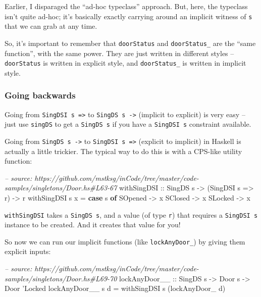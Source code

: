 \documentclass[]{article}
\newenvironment{Shaded}{}{}
\newcommand{\KeywordTok}[1]{\textcolor[rgb]{0.00,0.44,0.13}{\textbf{#1}}}
\newcommand{\DataTypeTok}[1]{\textcolor[rgb]{0.56,0.13,0.00}{#1}}
\newcommand{\CharTok}[1]{\textcolor[rgb]{0.25,0.44,0.63}{#1}}
\newcommand{\CommentTok}[1]{\textcolor[rgb]{0.38,0.63,0.69}{\textit{#1}}}
\newcommand{\OtherTok}[1]{\textcolor[rgb]{0.00,0.44,0.13}{#1}}
\newcommand{\FunctionTok}[1]{\textcolor[rgb]{0.02,0.16,0.49}{#1}}
\newcommand{\NormalTok}[1]{#1}
\begin{document}
Earlier, I disparaged the ``ad-hoc typeclass'' approach. But, here, the
typeclass isn't quite ad-hoc; it's basically exactly carrying around an implicit
witness of \texttt{s} that we can grab at any time.

So, it's important to remember that \texttt{doorStatus} and
\texttt{doorStatus\_} are the ``same function'', with the same power. They are
just written in different styles -- \texttt{doorStatus} is written in explicit
style, and \texttt{doorStatus\_} is written in implicit style.

\subsubsection{Going backwards}\label{going-backwards}

Going from \texttt{SingDSI\ s\ =\textgreater{}} to
\texttt{SingDS\ s\ -\textgreater{}} (implicit to explicit) is very easy -- just
use \texttt{singDS} to get a \texttt{SingDS\ s} if you have a
\texttt{SingDSI\ s} constraint available.

Going from \texttt{SingDS\ s\ -\textgreater{}} to
\texttt{SingDSI\ s\ =\textgreater{}} (explicit to implicit) in Haskell is
actually a little trickier. The typical way to do this is with a CPS-like
utility function:

\begin{Shaded}
\begin{Highlighting}[]
\CommentTok{-- source: https://github.com/mstksg/inCode/tree/master/code-samples/singletons/Door.hs#L63-67}
\OtherTok{withSingDSI ::} \DataTypeTok{SingDS}\NormalTok{ s }\OtherTok{->}\NormalTok{ (}\DataTypeTok{SingDSI}\NormalTok{ s }\OtherTok{=>}\NormalTok{ r) }\OtherTok{->}\NormalTok{ r}
\NormalTok{withSingDSI s x }\FunctionTok{=} \KeywordTok{case}\NormalTok{ s }\KeywordTok{of}
    \DataTypeTok{SOpened} \OtherTok{->}\NormalTok{ x}
    \DataTypeTok{SClosed} \OtherTok{->}\NormalTok{ x}
    \DataTypeTok{SLocked} \OtherTok{->}\NormalTok{ x}
\end{Highlighting}
\end{Shaded}

\texttt{withSingDSI} takes a \texttt{SingDS\ s}, and a value (of type
\texttt{r}) that requires a \texttt{SingDSI\ s} instance to be created. And it
creates that value for you!

So now we can run our implicit functions (like \texttt{lockAnyDoor\_}) by giving
them explicit inputs:

\begin{Shaded}
\begin{Highlighting}[]
\CommentTok{-- source: https://github.com/mstksg/inCode/tree/master/code-samples/singletons/Door.hs#L69-70}
\OtherTok{lockAnyDoor__ ::} \DataTypeTok{SingDS}\NormalTok{ s }\OtherTok{->} \DataTypeTok{Door}\NormalTok{ s }\OtherTok{->} \DataTypeTok{Door} \CharTok{'Locked}
\NormalTok{lockAnyDoor__ s d }\FunctionTok{=}\NormalTok{ withSingDSI s (lockAnyDoor_ d)}
\end{Highlighting}
\end{Shaded}
\end{document}
